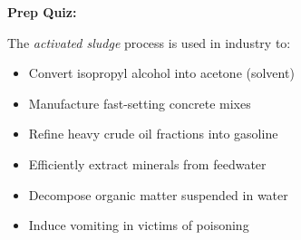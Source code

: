 \vfil \eject

\noindent
{\bf Prep Quiz:}

The {\it activated sludge} process is used in industry to:

\begin{itemize}
\item{} Convert isopropyl alcohol into acetone (solvent)
\vskip 5pt 
\item{} Manufacture fast-setting concrete mixes
\vskip 5pt 
\item{} Refine heavy crude oil fractions into gasoline
\vskip 5pt 
\item{} Efficiently extract minerals from feedwater
\vskip 5pt 
\item{} Decompose organic matter suspended in water
\vskip 5pt 
\item{} Induce vomiting in victims of poisoning
\end{itemize}




